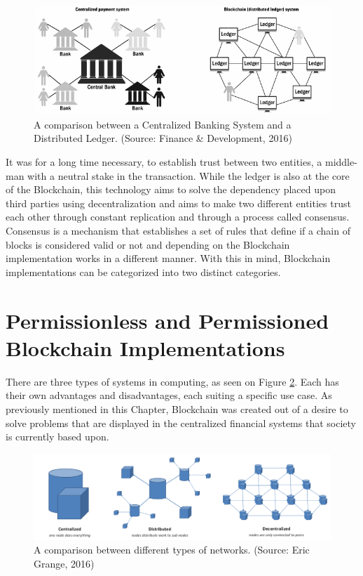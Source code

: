 \begin{figure}[h]
  \centering
  \includegraphics[width=1\linewidth]{imgs/blockchainvscentralizedNetwork.png}
  \caption{\label{fig:centralizedvsdescentralized} A comparison between a
  Centralized Banking System and a Distributed Ledger. (Source: Finance \&
  Development, 2016)}
\end{figure}

It was for a long time necessary, to establish trust between two entities, a
middle-man with a neutral stake in the transaction. While the ledger is also at
the core of the Blockchain, this technology aims to solve the dependency placed
upon third parties using decentralization and aims to make two different
entities trust each other through constant replication and through a process
called consensus.  Consensus is a mechanism that establishes a set of rules
that define if a chain of blocks is considered valid or not and depending on the Blockchain implementation works in a different manner. With this in mind, Blockchain implementations can be categorized into two distinct
categories.

\section{Permissionless and Permissioned Blockchain Implementations}

There are three types of systems in computing, as seen on Figure \ref{fig:typesofnetworks}. Each has their own advantages and disadvantages, each suiting a specific use case. As previously mentioned in this Chapter, Blockchain was created out of a desire to solve problems that are
displayed in the centralized financial systems that society is currently based upon.

\begin{figure}[h]
	\centering
	\includegraphics[width=1\linewidth]{imgs/typesofnetworks.png}
	\caption{\label{fig:typesofnetworks} A comparison between different types of networks. (Source: Eric Grange, 2016)}
\end{figure}

